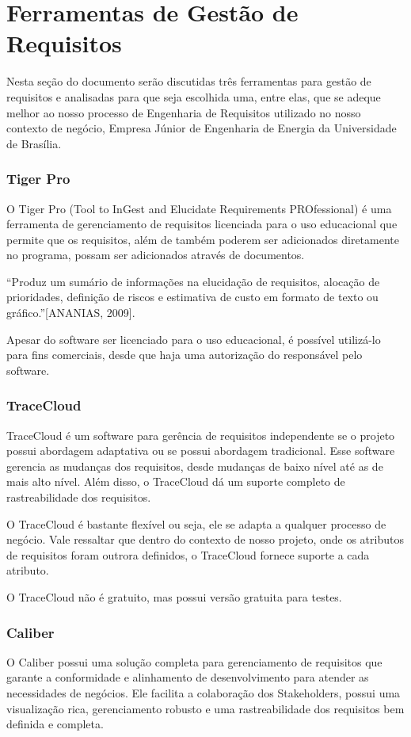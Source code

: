 \chapter[Ferramentas de Gestão de Requisitos]{Ferramentas de Gestão de Requisitos}
Nesta seção do documento serão discutidas três ferramentas para gestão de requisitos e analisadas para que seja escolhida uma, entre elas, que se adeque melhor ao nosso processo de Engenharia de Requisitos utilizado no nosso contexto de negócio, Empresa Júnior de Engenharia de Energia da Universidade de Brasília.


\subsection{Tiger Pro}
O Tiger Pro (Tool to InGest and Elucidate Requirements PROfessional) é uma ferramenta de gerenciamento de requisitos licenciada para o uso educacional que permite que os requisitos, além de também poderem ser adicionados diretamente no programa, possam ser adicionados através de documentos.

“Produz um sumário de informações na elucidação de requisitos, alocação de prioridades, definição de riscos e estimativa de custo em formato de texto ou gráfico.”[ANANIAS, 2009].

Apesar do software ser licenciado para o uso educacional, é possível utilizá-lo para fins comerciais, desde que haja uma autorização do responsável pelo software.

\subsection{TraceCloud}
TraceCloud é um software para gerência de requisitos independente se o projeto possui abordagem adaptativa ou se possui abordagem tradicional. Esse software gerencia as mudanças dos requisitos, desde mudanças de baixo nível até as de mais alto nível. Além disso, o TraceCloud dá um suporte completo de rastreabilidade dos requisitos.

O TraceCloud é bastante flexível ou seja, ele se adapta a qualquer processo de negócio. Vale ressaltar que dentro do contexto de nosso projeto, onde os atributos de requisitos foram outrora definidos, o TraceCloud fornece suporte a cada atributo.

O TraceCloud não é gratuito, mas possui versão gratuita para testes.

\subsection{Caliber}
O Caliber possui uma solução completa para gerenciamento de requisitos que garante a conformidade e alinhamento de desenvolvimento para atender as necessidades de negócios. Ele facilita a colaboração dos Stakeholders, possui uma visualização rica, gerenciamento robusto e uma rastreabilidade dos requisitos bem definida e completa.


